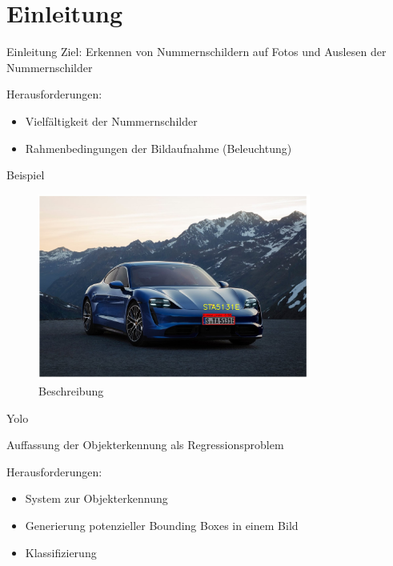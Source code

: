 \section{Einleitung}

\begin{frame}{Einleitung}
    Ziel: Erkennen von Nummernschildern auf Fotos und Auslesen der Nummernschilder
    
    Herausforderungen:
    \begin{itemize}
        \item Vielfältigkeit der Nummernschilder
        \item Rahmenbedingungen der Bildaufnahme (Beleuchtung)
    \end{itemize}
\end{frame}

\begin{frame}{Beispiel}
  \begin{figure}
    \begin{center}
      \includegraphics[width=0.8\textwidth]{bilder/Bild2}
      \caption{Beschreibung}
    \end{center}
  \end{figure}
  \end{frame}

\begin{frame}{Yolo}
    
    Auffassung der Objekterkennung als Regressionsproblem 
    
    Herausforderungen:
    \begin{itemize}
        \item System zur Objekterkennung 
        \item Generierung potenzieller Bounding Boxes in einem Bild
        \item Klassifizierung
    \end{itemize}
\end{frame}